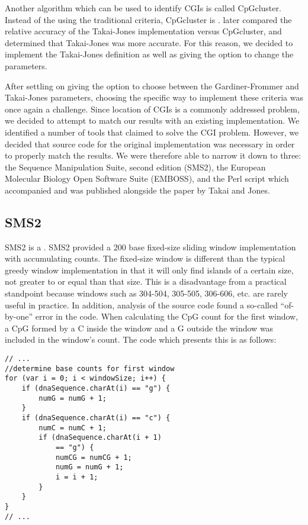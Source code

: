 \documentclass{bioinfo}
\begin{document}
Another algorithm which can be used to identify CGIs is called
CpGcluster. Instead of the using the traditional criteria, CpGcluster
is . \citep{pmid19232104}
later compared the relative accuracy of the Takai-Jones implementation
versus CpGcluster, and determined that Takai-Jones was more
accurate. For this reason, we decided to implement the Takai-Jones
definition as well as giving the option to change the parameters.

After settling on giving the option to choose between the
Gardiner-Frommer and Takai-Jones parameters, choosing the specific way
to implement these criteria was once again a challenge. Since location
of CGIs is a commonly addressed problem, we decided to attempt to
match our results with an existing implementation. We identified a
number of tools that claimed to solve the CGI problem. However, we
decided that source code for the original implementation was necessary
in order to properly match the results. We were therefore able to
narrow it down to three: the Sequence Manipulation Suite, second
edition (SMS2), the European Molecular Biology Open Software Suite
(EMBOSS), and the Perl script which accompanied and was published
alongside the paper by Takai and Jones.

\subsection{SMS2}

SMS2 is a . SMS2 provided a 200 base fixed-size sliding window
implementation with accumulating counts. The fixed-size window is
different than the typical greedy window implementation in that it
will only find islands of a certain size, not greater to or equal than
that size. This is a disadvantage from a practical standpoint because
windows such as 304-504, 305-505, 306-606, etc. are rarely useful in
practice. In addition, analysis of the source code found a so-called
``of-by-one'' error in the code. When calculating the CpG count for
the first window, a CpG formed by a C inside the window and a G
outside the window was included in the window's count. The code which
presents this is as follows:

\begin{verbatim}
// ...
//determine base counts for first window
for (var i = 0; i < windowSize; i++) {
    if (dnaSequence.charAt(i) == "g") {
        numG = numG + 1;
    }
    if (dnaSequence.charAt(i) == "c") {
        numC = numC + 1;
        if (dnaSequence.charAt(i + 1)
            == "g") {
            numCG = numCG + 1;
            numG = numG + 1;
            i = i + 1;
        }
    }
}
// ...
\end{verbatim}
\end{document}
